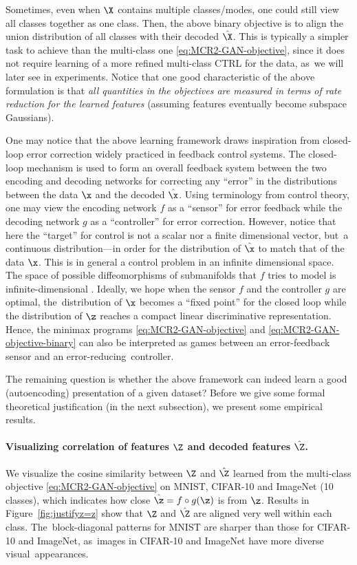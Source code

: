 \documentclass[../../book-main.tex]{subfiles}
\begin{document}
Sometimes, even when $\X$ contains multiple classes/modes, one could still view all classes together as one class. Then, the above binary objective is to align the union distribution of all classes with their decoded $\hat \X$. This is typically a simpler task to achieve than the multi-class one \eqref{eq:MCR2-GAN-objective}, since it does not require learning of a more refined multi-class CTRL for the data, as~we will later see in experiments. Notice that one good characteristic of the above formulation is that {\em all quantities in the objectives are measured in terms of rate reduction for the learned features} (assuming features eventually become subspace Gaussians). 

One may notice that the above learning framework draws inspiration from closed-loop error correction widely practiced in feedback control systems. The closed-loop mechanism is used to form an overall feedback system between the two encoding and decoding networks for correcting any  ``error'' in the distributions between the data $\x$ and the decoded $\hat \x$. Using terminology from control theory, one may view the encoding network $f$ as a ``sensor'' for error feedback while the decoding network $g$ as a ``controller'' for error correction. However, notice that here the ``target'' for control is not a scalar nor a finite dimensional vector, but~a continuous distribution---in order for the distribution of $\hat \x$ to match that of the data $\x$. This is in general a control problem in an infinite dimensional space. The space of possible diffeomorphisms of submanifolds that $f$ tries to model is infinite-dimensional \cite{Lee2002IntroductionTS}. Ideally, we hope when the sensor $f$ and the controller $g$ are optimal, the~distribution of $\x$ becomes a ``fixed point'' for the closed loop while the distribution of $\z$ reaches a compact linear discriminative representation. Hence, the minimax programs \eqref{eq:MCR2-GAN-objective} and \eqref{eq:MCR2-GAN-objective-binary} can also be interpreted as games between an error-feedback sensor and an error-reducing~controller.

The remaining question is whether the above framework can indeed learn a good (autoencoding) presentation of a given dataset? Before we give some formal theoretical justification (in the next subsection), we present some empirical results. 

\paragraph{Visualizing correlation of features $\Z$ and decoded features $\hat \Z$.} We visualize the cosine similarity between $\Z$ and $\hat{\Z}$ learned from the multi-class objective \eqref{eq:MCR2-GAN-objective} on MNIST, CIFAR-10 and ImageNet (10 classes), which indicates how close $\hat{\z} = f\circ g(\z)$ is from $\z$. Results in Figure~\ref{fig:justifyz=z} show that $\Z$ and $\hat{\Z}$ are aligned very well within each class. The~block-diagonal patterns for MNIST are sharper than those for CIFAR-10 and ImageNet, as~images in CIFAR-10 and ImageNet have more diverse visual~appearances.
\end{document}
